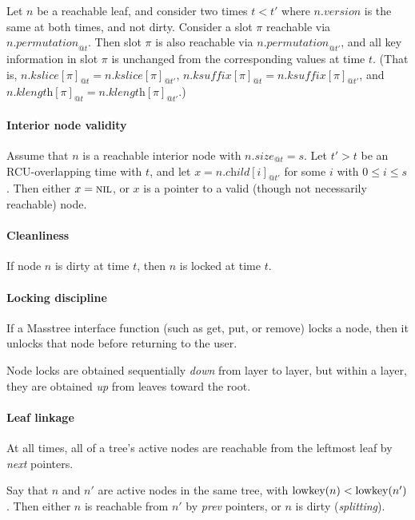 \documentclass[11pt]{article}
\makeatletter
\newcommand{\V}[1]{\textit{#1}}
\newcommand{\N}[1]{\text{\upshape{#1}}}
\newcommand{\NIL}{\textsc{nil}}
\newcommand{\AT}[2]{\ensuremath{#1_{@#2}}}
\makeatother
\begin{document}
Let \(n\) be a reachable leaf, and consider two times \(t<t'\) where
\(n.\V{version}\) is the same at both times, and not dirty. Consider a
slot \(\pi\) reachable via \(\AT{n.\V{permutation}}{t}\). Then
slot \(\pi\) is also reachable via \(\AT{n.\V{permutation}}{t'}\), and
all key information in slot \(\pi\) is unchanged from the corresponding values at time
\(t\). (That is, \(\AT{n.\V{kslice}[\pi]}{t} =
\AT{n.\V{kslice}[\pi]}{t'}\), \(\AT{n.\V{ksuffix}[\pi]}{t} =
\AT{n.\V{ksuffix}[\pi]}{t'}\),  and \(\AT{n.\V{klength}[\pi]}{t} =
\AT{n.\V{klength}[\pi]}{t'}\).)

\paragraph{Interior node validity}

Assume that \(n\) is a reachable interior node with
\(\AT{n.\V{size}}{t} = s\). Let \(t'>t\) be an RCU-overlapping time with
\(t\), and let \(x = \AT{n.\V{child}[i]}{t'}\) for some \(i\) with \(0
\leq i \leq s\). Then either \(x = \NIL\), or \(x\) is a pointer to a
valid (though not necessarily reachable) node.

\paragraph{Cleanliness}

If node \(n\) is dirty at time \(t\), then \(n\) is locked at time \(t\).

\paragraph{Locking discipline}

If a Masstree interface function (such as get, put, or remove) locks a
node, then it unlocks that node before returning to the user.

Node locks are obtained sequentially \emph{down} from layer to layer, but
within a layer, they are obtained \emph{up} from leaves toward the root.

\paragraph{Leaf linkage}

At all times, all of a tree's active nodes are reachable from the
leftmost leaf by \V{next} pointers.

Say that \(n\) and \(n'\) are active nodes in the same tree, with
\(\N{lowkey}(n) < \N{lowkey}(n')\). Then either \(n\) is reachable from
\(n'\) by \V{prev} pointers, or \(n\) is dirty (\V{splitting}).
\end{document}
